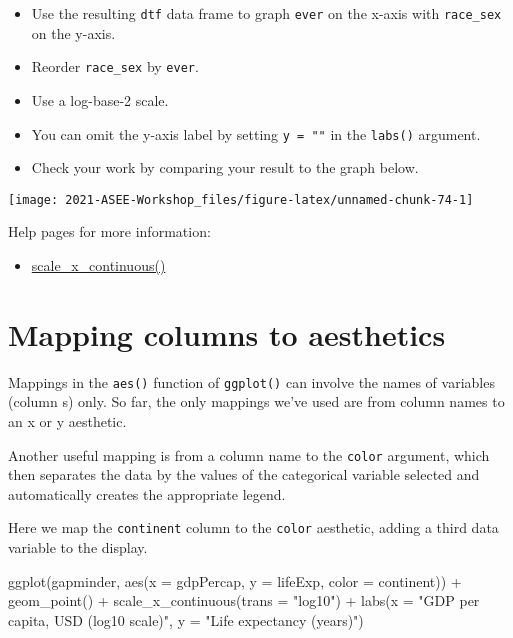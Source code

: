 \documentclass[
]{book}
\newenvironment{Shaded}{\begin{snugshade}}{\end{snugshade}}
\newcommand{\AttributeTok}[1]{\textcolor[rgb]{0.77,0.63,0.00}{#1}}
\newcommand{\FunctionTok}[1]{\textcolor[rgb]{0.00,0.00,0.00}{#1}}
\newcommand{\NormalTok}[1]{#1}
\newcommand{\SpecialCharTok}[1]{\textcolor[rgb]{0.00,0.00,0.00}{#1}}
\newcommand{\StringTok}[1]{\textcolor[rgb]{0.31,0.60,0.02}{#1}}
\providecommand{\tightlist}{%
  \setlength{\itemsep}{0pt}\setlength{\parskip}{0pt}}
\begin{document}
\begin{itemize}
\tightlist
\item
  Use the resulting \texttt{dtf} data frame to graph \texttt{ever} on the x-axis with \texttt{race\_sex} on the y-axis.\\
\item
  Reorder \texttt{race\_sex} by \texttt{ever}.\\
\item
  Use a log-base-2 scale.\\
\item
  You can omit the y-axis label by setting \texttt{y\ =\ ""} in the \texttt{labs()} argument.\\
\item
  Check your work by comparing your result to the graph below.
\end{itemize}

\texttt{[image: 2021-ASEE-Workshop\_files/figure-latex/unnamed-chunk-74-1]}

Help pages for more information:

\begin{itemize}
\tightlist
\item
  \href{https://ggplot2.tidyverse.org/reference/scale_continuous.html}{scale\_x\_continuous()}
\end{itemize}

\hypertarget{mapping-columns-to-aesthetics}{%
\section{Mapping columns to aesthetics}\label{mapping-columns-to-aesthetics}}

Mappings in the \texttt{aes()} function of \texttt{ggplot()} can involve the names of variables (column s) only. So far, the only mappings we've used are from column names to an x or y aesthetic.

Another useful mapping is from a column name to the \texttt{color} argument, which then separates the data by the values of the categorical variable selected and automatically creates the appropriate legend.

Here we map the \texttt{continent} column to the \texttt{color} aesthetic, adding a third data variable to the display.

\begin{Shaded}
\begin{Highlighting}[]
\FunctionTok{ggplot}\NormalTok{(gapminder, }\FunctionTok{aes}\NormalTok{(}\AttributeTok{x =}\NormalTok{ gdpPercap, }\AttributeTok{y =}\NormalTok{ lifeExp, }\AttributeTok{color =}\NormalTok{ continent)) }\SpecialCharTok{+}
  \FunctionTok{geom\_point}\NormalTok{() }\SpecialCharTok{+}
  \FunctionTok{scale\_x\_continuous}\NormalTok{(}\AttributeTok{trans =} \StringTok{"log10"}\NormalTok{) }\SpecialCharTok{+}
  \FunctionTok{labs}\NormalTok{(}\AttributeTok{x =} \StringTok{"GDP per capita, USD (log10 scale)"}\NormalTok{, }
       \AttributeTok{y =} \StringTok{"Life expectancy (years)"}\NormalTok{)}
\end{Highlighting}
\end{Shaded}
\end{document}
